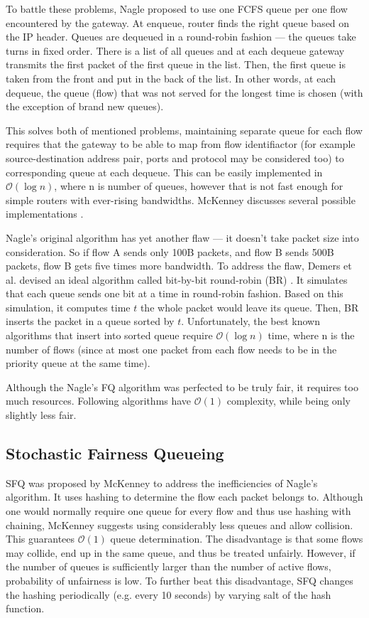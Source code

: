 To battle these problems, Nagle \cite{Nagle:FQ} proposed to use one FCFS queue per one flow encountered by the gateway. At enqueue, router finds the right queue based on the IP header. Queues are dequeued in a round-robin fashion --- the queues take turns in fixed order. There is a list of all queues and at each dequeue gateway transmits the first packet of the first queue in the list. Then, the first queue is taken from the front and put in the back of the list. In other words, at each dequeue, the queue (flow) that was not served for the longest time is chosen (with the exception of brand new queues).

This solves both of mentioned problems, maintaining separate queue for each flow requires that the gateway to be able to map from flow identifiactor (for example source-destination address pair, ports and protocol may be considered too) to corresponding queue at each dequeue. This can be easily implemented in $\mathcal{O}(\log n)$, where n is number of queues, however that is not fast enough for simple routers with ever-rising bandwidths. McKenney discusses several possible implementations \cite[Section 2]{SFQ}.

Nagle's original algorithm has yet another flaw --- it doesn't take packet size into consideration. So if flow A sends only 100B packets, and flow B sends 500B packets, flow B gets five times more bandwidth. To address the flaw,  Demers et al. devised an ideal algorithm called bit-by-bit round-robin (BR) \cite{demers1989analysis}. It simulates that each queue sends one bit at a time in round-robin fashion. Based on this simulation, it computes time $t$ the whole packet would leave its queue. Then, BR inserts the packet in a queue sorted by $t$. Unfortunately, the best known algorithms that insert into sorted queue require $\mathcal{O}(\log n)$ time, where n is the number of flows (since at most one packet from each flow needs to be in the priority queue at the same time).

Although the Nagle's FQ algorithm was perfected to be truly fair, it requires too much resources. Following algorithms have $\mathcal{O}(1)$ complexity, while being only slightly less fair.


\subsection{Stochastic Fairness Queueing}


SFQ was proposed by McKenney \cite{SFQ} to address the inefficiencies of Nagle’s algorithm. It uses hashing to determine the flow each packet belongs to. Although one would normally require one queue for every flow and thus use hashing with chaining, McKenney suggests using considerably less queues and allow collision. This guarantees $\mathcal{O}(1)$ queue determination. The disadvantage is that some flows may collide, end up in the same queue, and thus be treated unfairly. However, if the number of queues is sufficiently larger than the number of active flows, probability of unfairness is low. To further beat this disadvantage, SFQ changes the hashing periodically (e.g. every 10 seconds) by varying salt of the hash function.

